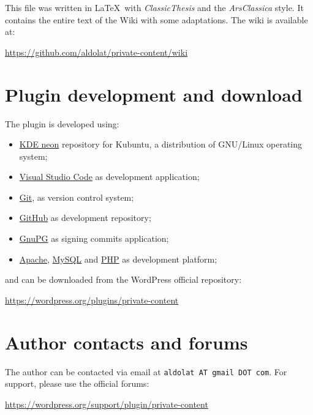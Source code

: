 \begingroup
	\footnotesize

	\noindent This file was written in \LaTeX~with \textit{ClassicThesis} and
	the \textit{ArsClassica} style. It contains the entire text of the Wiki with
	some adaptations. The wiki is available at:

	\begin{center}
		\url{https://github.com/aldolat/private-content/wiki}
	\end{center}

	\section*{Plugin development and download}

	\noindent The plugin is developed using:

	\begin{itemize}
		\item \href{https://neon.kde.org/}{KDE neon} repository for Kubuntu, a
		distribution of GNU/Linux operating system;
		\item \href{https://code.visualstudio.com}{Visual Studio Code} as
		development application;
		\item \href{https://git-scm.com}{Git}, as version control system;
		\item \href{https://github.com/aldolat/private-content}{GitHub} as
		development repository;
		\item \href{https://gnupg.org}{GnuPG} as signing commits application;
		\item \href{http://apache.org/}{Apache},
		\href{https://www.mysql.com/it/}{MySQL} and
		\href{https://www.php.net/}{PHP} as development platform;
	\end{itemize}

	and can be downloaded from the WordPress official repository:
	\begin{center}
	\url{https://wordpress.org/plugins/private-content}
	\end{center}

	\section*{Author contacts and forums}

	\noindent The author can be contacted via email at \texttt{aldolat AT gmail
	DOT com}.
	For support, please use the official forums:
	\begin{center}
	\url{https://wordpress.org/support/plugin/private-content}
	\end{center}

